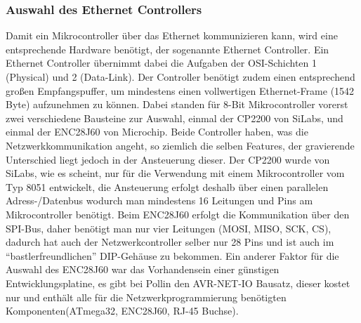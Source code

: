 \documentclass[a4paper,14pt,headsepline]{scrartcl}
\begin{document}
\subsubsection{Auswahl des Ethernet Controllers}
Damit ein Mikrocontroller über das Ethernet kommunizieren kann, wird eine entsprechende Hardware benötigt, der sogenannte Ethernet Controller. Ein Ethernet Controller übernimmt dabei die Aufgaben der OSI-Schichten 1 (Physical) und 2 (Data-Link). Der Controller benötigt zudem einen entsprechend großen Empfangspuffer, um mindestens einen vollwertigen Ethernet-Frame (1542 Byte) aufzunehmen zu können. Dabei standen für 8-Bit Mikrocontroller vorerst zwei verschiedene Bausteine zur Auswahl, einmal der CP2200 von SiLabs, und einmal der ENC28J60 von Microchip. Beide Controller haben, was die Netzwerkkommunikation angeht, so ziemlich die selben Features, der gravierende Unterschied liegt jedoch in der Ansteuerung dieser. Der CP2200 wurde von SiLabs, wie es scheint, nur für die Verwendung mit einem Mikrocontroller vom Typ 8051 entwickelt, die Ansteuerung erfolgt deshalb über einen parallelen Adress-/Datenbus wodurch man mindestens 16 Leitungen und Pins am Mikrocontroller benötigt. Beim ENC28J60 erfolgt die Kommunikation über den SPI-Bus, daher benötigt man nur vier Leitungen (MOSI, MISO, SCK, CS), dadurch hat auch der Netzwerkcontroller selber nur 28 Pins und ist auch im "`bastlerfreundlichen"' DIP-Gehäuse zu bekommen. Ein anderer Faktor für die Auswahl des ENC28J60 war das Vorhandensein einer günstigen Entwicklungsplatine, es gibt bei Pollin den AVR-NET-IO Bausatz, dieser kostet nur  und enthält alle für die Netzwerkprogrammierung benötigten Komponenten(ATmega32, ENC28J60, RJ-45 Buchse).
\end{document}

